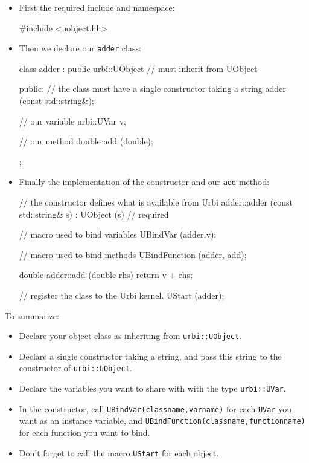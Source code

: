 \begin{itemize}
\item{First the required include and namespace:}

\begin{urbiscript}
#include <uobject.hh>
\end{urbiscript}

\item{Then we declare our \lstinline{adder} class:}
\begin{urbiscript}
class adder : public urbi::UObject // must inherit from UObject
{
  public:
     // the class must have a single constructor taking a string
     adder (const std::string&);

     // our variable
     urbi::UVar v;

     // our method
     double add (double);
};
\end{urbiscript}
\item{Finally the implementation of the constructor and our \lstinline{add} method:}
\begin{urbiscript}
// the constructor defines what is available from Urbi
adder::adder (const std::string& s)
  : UObject (s) // required
{

  // macro used to bind variables
  UBindVar (adder,v);

  // macro used to bind methods
  UBindFunction (adder, add);
}

double
adder::add (double rhs)
{
  return v + rhs;
}

// register the class to the Urbi kernel.
UStart (adder);
\end{urbiscript}
\end{itemize}

To summarize:

\begin{itemize}
\item{Declare your object class as inheriting from
  \lstinline{urbi::UObject}.}
\item{Declare a single constructor taking a string, and pass this
  string to the constructor of \lstinline{urbi::UObject}.}
\item{Declare the variables you want to share with \urbi with the type
  \lstinline{urbi::UVar}.}
\item{In the constructor, call \lstinline{UBindVar(classname,varname)}
  for each \lstinline{UVar} you want as an instance variable, and
  \lstinline{UBindFunction(classname,functionname)} for each function
  you want to bind.}
\item{Don't forget to call the macro \lstinline{UStart} for each
  object.}
\end{itemize}

